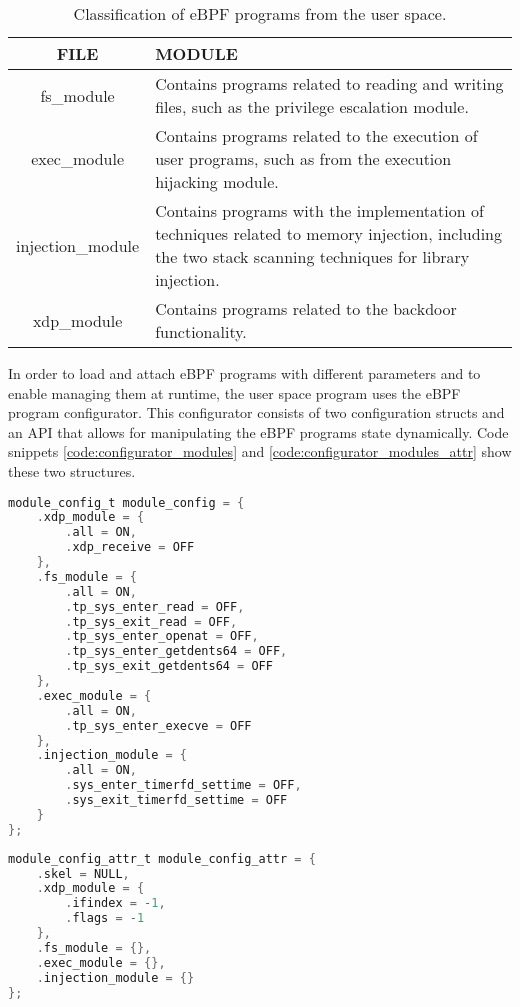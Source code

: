 \begin{table}[htbp]
\begin{tabular}{|c|>{\centering\arraybackslash}p{8cm}|}
\hline
\textbf{FILE} & \textbf{MODULE} \\
\hline
\hline
fs\_module & Contains programs related to reading and writing files, such as the privilege escalation module.\\
\hline
exec\_module & Contains programs related to the execution of user programs, such as from the execution hijacking module.\\
\hline
injection\_module & Contains programs with the implementation of techniques related to memory injection, including the two stack scanning techniques for library injection.\\
\hline
xdp\_module & Contains programs related to the backdoor functionality.\\
\hline
\end{tabular}
\caption{Classification of eBPF programs from the user space.}
\label{table:modules_list}
\end{table}

In order to load and attach eBPF programs with different parameters and 
to enable managing them at runtime, the user space program uses the eBPF program configurator. This configurator consists of two configuration structs and an API that allows for manipulating the eBPF programs state dynamically. Code snippets \ref{code:configurator_modules} and \ref{code:configurator_modules_attr} show these two structures.

\begin{lstlisting}[language=C, caption={Program configurator struct with list of modules.}, label={code:configurator_modules}]
module_config_t module_config = {
    .xdp_module = {
        .all = ON,
        .xdp_receive = OFF
    },
    .fs_module = {
        .all = ON,
        .tp_sys_enter_read = OFF,
        .tp_sys_exit_read = OFF,
        .tp_sys_enter_openat = OFF,
        .tp_sys_enter_getdents64 = OFF,
        .tp_sys_exit_getdents64 = OFF
    },
    .exec_module = {
        .all = ON,
        .tp_sys_enter_execve = OFF
    },
    .injection_module = {
        .all = ON,
        .sys_enter_timerfd_settime = OFF,
        .sys_exit_timerfd_settime = OFF
    }
};
\end{lstlisting}

\begin{lstlisting}[language=C, caption={Program configurator struct with attributes for each module.}, label={code:configurator_modules_attr}]
module_config_attr_t module_config_attr = {
    .skel = NULL,
    .xdp_module = {
        .ifindex = -1,
        .flags = -1
    },
    .fs_module = {},
    .exec_module = {},
    .injection_module = {}
};
\end{lstlisting}


